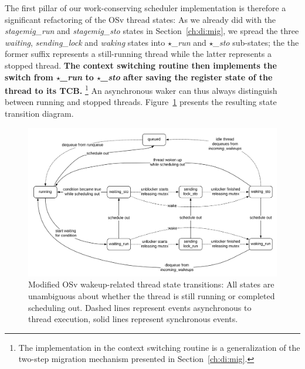 \documentclass[12pt,a4paper]{book}
\begin{document}
The first pillar of our work-conserving scheduler implementation is therefore a significant refactoring of the OSv thread states:
As we already did with the \textit{stagemig\_run} and \textit{stagemig\_sto} states in Section~\ref{ch:di:mig},
we spread the three \textit{waiting}, \textit{sending\_lock} and \textit{waking} states into \textit{$\star$\_run} and \textit{$\star$\_sto} sub-states; the the former suffix represents a still-running thread while the latter represents a stopped thread.
\textbf{The context switching routine then implements the switch from \textit{$\star$\_run} to \textit{$\star$\_sto} after saving the register state of the thread to its TCB.}%
\footnote{The implementation in the context switching routine is a generalization of the two-step migration mechanism presented in Section~\ref{ch:di:mig}.}
An asynchronous waker can thus always distinguish between running and stopped threads.
Figure~\ref{fig:di:wake:spreadstates} presents the resulting state transition diagram.

\begin{figure}
    \centering
    \includegraphics[width=\textwidth]{fig_build/state_chart_post_spread}
    \caption{Modified OSv wakeup-related thread state transitions: All states are unambiguous about whether the thread is still running or completed scheduling out.
        Dashed lines represent events asynchronous to thread execution, solid lines represent synchronous events.
    }
    \label{fig:di:wake:spreadstates}
\end{figure}
\end{document}
